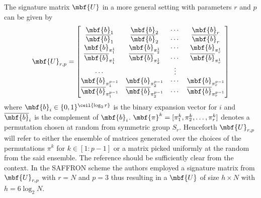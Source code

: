 \documentclass[conference,twocolumn]{IEEEtran}
\begin{document}
 
 The signature matrix 	$\mbf{U}$ in a more general setting with parameters $r$ and $p$ can be given by
 \begin{align}
\label{Eqn:SignatureMatrix}
\mbf{U}_{r,p}=\begin{bmatrix}
\mbf{b}_1  & \mbf{b}_2 &\cdots & \mbf{b}_r \\
\overline{\mbf{b}}_1 & \overline{\mbf{b}}_2 & \cdots & \overline{\mbf{b}}_r\\
\mbf{b}_{\pi^{1}_{1}} & \mbf{b}_{\pi^{1}_{2}} & \cdots & \mbf{b}_{\pi^{1}_{r}}\\
\overline{\mbf{b}}_{\pi^{1}_{1}} & \overline{\mbf{b}}_{\pi^{1}_{2}} & \cdots & \overline{\mbf{b}}_{\pi^{1}_{r}}\\
\cdots &  &\vdots \\
\mbf{b}_{\pi^{p-1}_{1}} & \mbf{b}_{\pi^{p-1}_{2}} & \cdots & \mbf{b}_{\pi^{p-1}_{r}}\\
\overline{\mbf{b}}_{\pi^{p-1}_{1}} & \overline{\mbf{b}}_{\pi^{p-1}_{2}} & \cdots & \overline{\mbf{b}}_{\pi^{p-1}_{r}}
\end{bmatrix}
\end{align}  
where $\mbf{b}_{i}\in\{0,1\}^{\ceil{\log_{2}r}}$ is the binary expansion vector for $i$ and $\overline{\mbf{b}}_{i}$ is the complement of $\mbf{b}_{i}$. $\mbf{\pi}^{k}=[\pi^{k}_1,\pi^{k}_2,\ldots,\pi^{k}_r]$ denotes a permutation chosen at random from symmetric group $S_{r}$. Henceforth $\mbf{U}_{r,p}$ will refer to either the ensemble of matrices generated over the choices of the permutations $\pi^{k}$ for $k\in[1:p-1]$ or a matrix picked uniformly at the random from the said ensemble. The reference should be sufficiently clear from the context. In the SAFFRON scheme the authors employed a signature matrix from $\mbf{U}_{r,p}$ with $r=N$ and $p=3$ thus resulting in a $\mbf{U}$ of size $h \times N$ with $h=6\log_{2}N$. 
\end{document}
